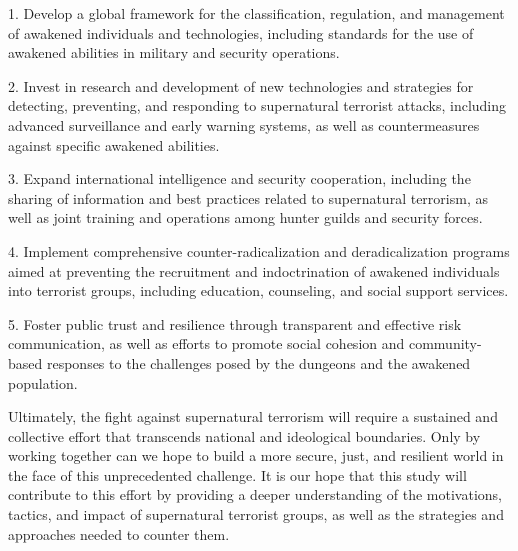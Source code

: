 \documentclass[12pt, a4paper]{article}
\begin{document}
1. Develop a global framework for the classification, regulation, and management of awakened individuals and technologies, including standards for the use of awakened abilities in military and security operations.

2. Invest in research and development of new technologies and strategies for detecting, preventing, and responding to supernatural terrorist attacks, including advanced surveillance and early warning systems, as well as countermeasures against specific awakened abilities.

3. Expand international intelligence and security cooperation, including the sharing of information and best practices related to supernatural terrorism, as well as joint training and operations among hunter guilds and security forces.

4. Implement comprehensive counter-radicalization and deradicalization programs aimed at preventing the recruitment and indoctrination of awakened individuals into terrorist groups, including education, counseling, and social support services.

5. Foster public trust and resilience through transparent and effective risk communication, as well as efforts to promote social cohesion and community-based responses to the challenges posed by the dungeons and the awakened population.

Ultimately, the fight against supernatural terrorism will require a sustained and collective effort that transcends national and ideological boundaries. Only by working together can we hope to build a more secure, just, and resilient world in the face of this unprecedented challenge. It is our hope that this study will contribute to this effort by providing a deeper understanding of the motivations, tactics, and impact of supernatural terrorist groups, as well as the strategies and approaches needed to counter them.



\end{document}
